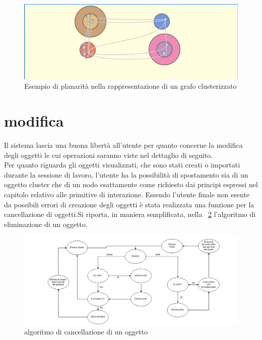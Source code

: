 {\begin{figure}[!htb]
	\begin{center}
		\includegraphics[width=0.8 \linewidth]{figure/archi}
	\end{center}
	\caption{Esempio di planarità nella rappresentazione di un grafo clusterizzato\label{fig:archi}}
\end{figure}

\section{modifica}
Il sistema lascia una buona libertà all'utente per quanto concerne la modifica degli oggetti le cui operazioni saranno viste nel dettaglio di seguito. \\
Per quanto riguarda gli oggetti visualizzati, che sono stati creati o importati durante la sessione di lavoro, l'utente ha la possibilità di spostamento sia di un oggetto cluster che di un nodo esattamente come richiesto dai principi espressi nel capitolo relativo alle primitive di interazione.
Essendo l'utente finale non esente da possibili errori di creazione degli oggetti è stata realizzata una funzione per la cancellazione di oggetti.Si riporta, in maniera semplificata, nella \figurename~\ref{fig:delete} l'algoritmo di eliminazione di un oggetto.
\begin{figure}[!htb]
	\begin{center}
		\includegraphics[width=1 \linewidth]{figure/delete}
	\end{center}
	\caption{algoritmo di cancellazione di un oggetto\label{fig:delete}}
\end{figure}
}
